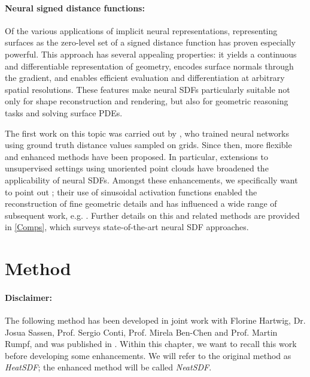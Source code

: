 \documentclass[12pt,openany]{book}
\theoremstyle{plainnormal}
\theoremstyle{remark}
\begin{document}
\paragraph{Neural signed distance functions:}  
Of the various applications of implicit neural representations, representing surfaces as the zero-level set of a signed distance function has proven especially powerful.
This approach has several appealing properties: it yields a continuous and differentiable representation of geometry, encodes surface normals through the gradient, and enables efficient evaluation and differentiation at arbitrary spatial resolutions. These features make neural SDFs particularly suitable not only for shape reconstruction and rendering, but also for geometric reasoning tasks and solving surface PDEs.\par
The first work on this topic was carried out by \cite{park2019deepsdflearningcontinuoussigned}, who trained neural networks using ground truth distance values sampled on grids. Since then, more flexible and enhanced methods have been proposed. In particular, extensions to unsupervised settings using unoriented point clouds have broadened the applicability of neural SDFs. Amongst these enhancements, we specifically want to point out \cite{sitzmann2020implicitneuralrepresentationsperiodic}; their use of sinusoidal activation functions enabled the reconstruction of fine geometric details and has influenced a wide range of subsequent work, e.g. \cite{wang2023neuralsingularhessianimplicitneuralrepresentation}. Further details on this and related methods are provided in \cref{Comps}, which surveys state-of-the-art neural SDF approaches.
\section{Method}\label{section_SDFmethod}
\paragraph{Disclaimer:} The following method has been developed in joint work with Florine Hartwig, Dr. Josua Sassen, Prof. Sergio Conti, Prof. Mirela Ben-Chen and Prof. Martin Rumpf, and was published in \cite{weidemaier2025sdfsunorientedpointclouds}. Within this chapter, we want to recall this work before developing some enhancements. We will refer to the original method as \emph{HeatSDF}; the enhanced method will be called \emph{NeatSDF}.
\end{document}
